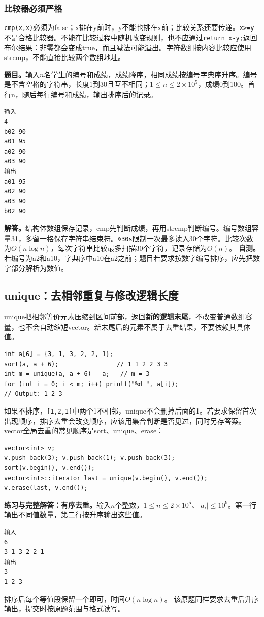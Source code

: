 \subsubsection{比较器必须严格}
\texttt{cmp(x,x)}必须为false；x排在y前时，y不能也排在x前；比较关系还要传递。\texttt{x>=y}不是合格比较器。不能在比较过程中随机改变规则，也不应通过\texttt{return x-y;}返回布尔结果：非零都会变成true，而且减法可能溢出。字符数组按内容比较应使用strcmp，不能直接比较两个数组地址。

\textbf{题目。}输入$n$名学生的编号和成绩，成绩降序，相同成绩按编号字典序升序。编号是不含空格的字符串，长度1到30且互不相同；$1\le n\le2\times10^5$，成绩0到100。首行n，随后每行编号和成绩，输出排序后的记录。
\begin{verbatim}
输入
4
b02 90
a01 95
a02 90
a03 90
输出
a01 95
a02 90
a03 90
b02 90
\end{verbatim}
\textbf{解答。}结构体数组保存记录，cmp先判断成绩，再用strcmp判断编号。编号数组容量31，多留一格保存字符串结束符。\texttt{\%30s}限制一次最多读入30个字符。比较次数为$O(n\log n)$，每次字符串比较最多扫描30个字符，记录存储为$O(n)$。
\textbf{自测。}若编号为a2和a10，字典序中a10在a2之前；题目若要求按数字编号排序，应先把数字部分解析为数值。

\subsection{unique：去相邻重复与修改逻辑长度}
unique把相邻等价元素压缩到区间前部，返回\textbf{新的逻辑末尾}，不改变普通数组容量，也不会自动缩短vector。新末尾后的元素不属于去重结果，不要依赖其具体值。
\begin{lstlisting}
int a[6] = {3, 1, 3, 2, 2, 1};
sort(a, a + 6);                // 1 1 2 2 3 3
int m = unique(a, a + 6) - a;   // m = 3
for (int i = 0; i < m; i++) printf("%d ", a[i]);
// Output: 1 2 3
\end{lstlisting}
如果不排序，\texttt{[1,2,1]}中两个1不相邻，unique不会删掉后面的1。若要求保留首次出现顺序，排序去重会改变顺序，应该用集合判断是否见过，同时另存答案。vector全局去重的常见顺序是sort、unique、erase：
\begin{lstlisting}
vector<int> v;
v.push_back(3); v.push_back(1); v.push_back(3);
sort(v.begin(), v.end());
vector<int>::iterator last = unique(v.begin(), v.end());
v.erase(last, v.end());
\end{lstlisting}
\textbf{练习与完整解答：有序去重。}输入$n$个整数，$1\le n\le2\times10^5$、$|a_i|\le10^9$。第一行输出不同值数量，第二行按升序输出这些值。
\begin{verbatim}
输入
6
3 1 3 2 2 1
输出
3
1 2 3
\end{verbatim}
排序后每个等值段保留一个即可，时间$O(n\log n)$。
该原题同样要求去重后升序输出，提交时按原题范围与格式读写。

